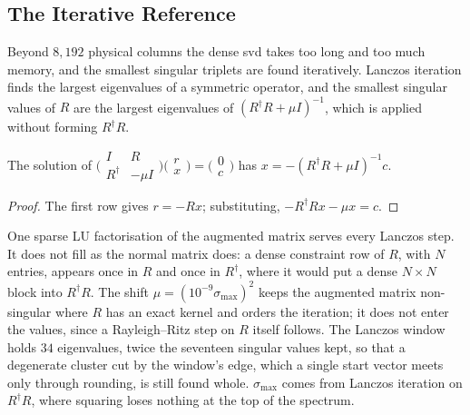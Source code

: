 \subsection{The Iterative Reference}
\label{app:iterative-reference}

Beyond $8{,}192$ physical columns the dense \gls{svd} takes too long and too much memory, and the smallest singular triplets are found iteratively. Lanczos iteration finds the largest eigenvalues of a symmetric operator, and the smallest singular values of $R$ are the largest eigenvalues of $(R^\dagger R+\mu I)^{-1}$, which is applied without forming $R^\dagger R$.

\begin{proposition}
The solution of $\bigl(\begin{smallmatrix}I&R\\R^\dagger&-\mu I\end{smallmatrix}\bigr)\bigl(\begin{smallmatrix}r\\x\end{smallmatrix}\bigr)=\bigl(\begin{smallmatrix}0\\c\end{smallmatrix}\bigr)$ has $x=-(R^\dagger R+\mu I)^{-1}c$.
\end{proposition}
\begin{proof}
The first row gives $r=-Rx$; substituting, $-R^\dagger Rx-\mu x=c$.
\end{proof}

One sparse LU factorisation of the augmented matrix serves every Lanczos step. It does not fill as the normal matrix does: a dense constraint row of $R$, with $N$ entries, appears once in $R$ and once in $R^\dagger$, where it would put a dense $N\times N$ block into $R^\dagger R$. The shift $\mu=(10^{-9}\sigma_{\max})^2$ keeps the augmented matrix non-singular where $R$ has an exact kernel and orders the iteration; it does not enter the values, since a Rayleigh--Ritz step on $R$ itself follows. The Lanczos window holds $34$ eigenvalues, twice the seventeen singular values kept, so that a degenerate cluster cut by the window's edge, which a single start vector meets only through rounding, is still found whole. $\sigma_{\max}$ comes from Lanczos iteration on $R^\dagger R$, where squaring loses nothing at the top of the spectrum.

